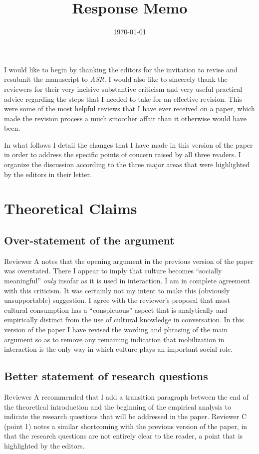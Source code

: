 \documentclass[11pt]{article}
\begin{document}
\title{Response Memo}
\date{\today}
\maketitle

I would like to begin by thanking the editors for the invitation to revise and resubmit the manuscript to \emph{ASR}.  I would also like to sincerely thank the reviewers for their very incisive substantive criticism and very useful practical advice regarding the steps that I needed to take for an effective revision.  This were some of the most helpful reviews that I have ever received on a paper, which made the revision process a much smoother affair than it otherwise would have been.  

In what follows I detail the changes that I have made in this version of the paper in order to address the specific points of concern raised by all three readers.  I organize the discussion according to the three major areas that were highlighted by the editors in their letter.

\section*{Theoretical Claims}
\subsection*{Over-statement of the argument}
Reviewer A notes that the opening argument in the previous version of the paper was overstated. There I appear to imply that culture becomes ``socially meaningful'' \emph{only} insofar as it is used in interaction.  I am in complete agreement with this criticism.  It was certainly not my intent to make this (obviously unsupportable) suggestion.   I agree with the reviewer's proposal that most cultural consumption has a ``conspicuous'' aspect that is analytically and empirically distinct from the use of cultural knowledge in conversation.   In this version of the paper I have revised the wording and phrasing of the main argument so as to remove any remaining indication that mobilization in interaction is the only way in which culture plays an important social role. 

\subsection*{Better statement of research questions}
Reviewer A recommended that I add a transition paragraph between the end of the theoretical introduction and the beginning of the empirical analysis to indicate the research questions that will be addressed in the paper.  Reviewer C (point 1) notes a similar shortcoming with the previous version of the paper, in that the research questions are not entirely clear to the reader, a point that is highlighted by the editors.   
\end{document}
